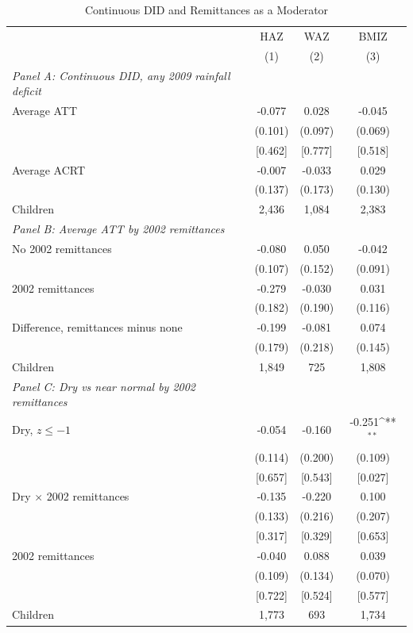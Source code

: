 \documentclass[12pt]{article}
\def\sym#1{\ifmmode^{#1}\else\(^{#1}\)\fi}
\begin{document}
\endgroup
\clearpage
\begingroup
\footnotesize
\renewcommand{\arraystretch}{0.86}
\setlength{\tabcolsep}{4pt}
\setlength{\LTcapwidth}{\textwidth}
\begin{longtable}{l*{3}{c}}
\caption{Continuous DID and Remittances as a Moderator}\\
\toprule
 & HAZ & WAZ & BMIZ\\
 & (1) & (2) & (3)\\
\midrule
\textit{Panel A: Continuous DID, any 2009 rainfall deficit} & & & \\
Average ATT & -0.077 & 0.028 & -0.045\\
 & (0.101) & (0.097) & (0.069)\\
 & [0.462] & [0.777] & [0.518]\\
Average ACRT & -0.007 & -0.033 & 0.029\\
 & (0.137) & (0.173) & (0.130)\\
Children & 2,436 & 1,084 & 2,383\\
\addlinespace[6pt]\textit{Panel B: Average ATT by 2002 remittances} & & & \\
No 2002 remittances & -0.080 & 0.050 & -0.042\\
 & (0.107) & (0.152) & (0.091)\\
2002 remittances & -0.279 & -0.030 & 0.031\\
 & (0.182) & (0.190) & (0.116)\\
Difference, remittances minus none & -0.199 & -0.081 & 0.074\\
 & (0.179) & (0.218) & (0.145)\\
Children & 1,849 & 725 & 1,808\\
\addlinespace[6pt]\textit{Panel C: Dry vs near normal by 2002 remittances} & & & \\
Dry, \ensuremath{z\le -1} & -0.054 & -0.160 & -0.251\sym{**}\\
 & (0.114) & (0.200) & (0.109)\\
 & [0.657] & [0.543] & [0.027]\\
Dry \ensuremath{\times} 2002 remittances & -0.135 & -0.220 & 0.100\\
 & (0.133) & (0.216) & (0.207)\\
 & [0.317] & [0.329] & [0.653]\\
2002 remittances & -0.040 & 0.088 & 0.039\\
 & (0.109) & (0.134) & (0.070)\\
 & [0.722] & [0.524] & [0.577]\\
Children & 1,773 & 693 & 1,734\\

\end{longtable}
\end{document}
